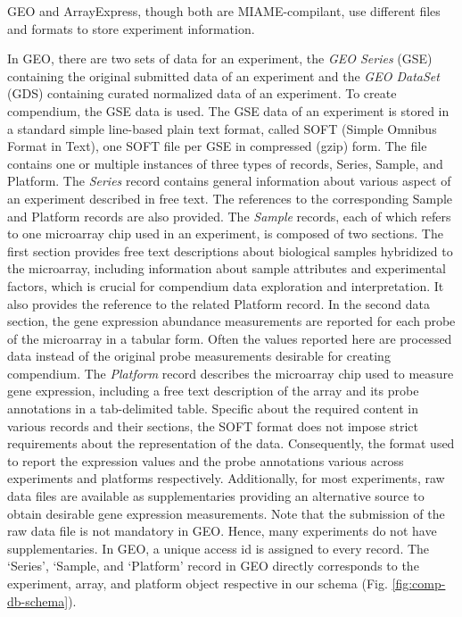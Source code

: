 GEO and ArrayExpress, though both are MIAME-compilant, use different 
files and formats to store experiment information.

%
In GEO, there are two sets of data for an experiment, the \textit{GEO Series}
(GSE) containing the original submitted data of an experiment and the
\textit{GEO DataSet} (GDS) containing curated normalized data of an experiment.
%
To create compendium, the GSE data is used.
%
The GSE data of an experiment is stored in a standard simple line-based plain
text format, called SOFT (Simple Omnibus Format in Text), one SOFT file per GSE
in compressed (gzip) form.
%
The file contains one or multiple instances of three types of records, Series,
Sample, and Platform.
%
The \textit{Series} record contains general information about various
aspect of an experiment described in free text.  The references to the
corresponding Sample and Platform records are also provided.
%
The \textit{Sample} records, each of which refers to one microarray chip
used in an experiment, is composed of two sections.
%
The first section provides free text descriptions about biological samples
hybridized to the microarray, including information about sample attributes and
experimental factors, which is crucial for compendium data exploration and
interpretation.
%
It also provides the reference to the related Platform record.
%
In the second data section, the gene expression abundance measurements are
reported for each probe of the microarray in a tabular form. Often the values
reported here are processed data instead of the original probe measurements
desirable for creating compendium.
%
The \textit{Platform} record describes the microarray chip used to measure gene
expression, including a free text description of the array and its probe
annotations in a tab-delimited table.
%
Specific about the required content in various records and their sections, the
SOFT format does not impose strict requirements about the representation of the
data.
%
Consequently, the format used to report the expression values and the probe
annotations various across experiments and platforms respectively.
%
Additionally, for most experiments, raw data files are available as
supplementaries providing an alternative source to obtain desirable gene
expression measurements.
%
Note that the submission of the raw data file is not mandatory in GEO.
%
Hence, many experiments do not have supplementaries.
%
In GEO, a unique access id is assigned to every record.
%
The `Series', `Sample, and `Platform' record in GEO directly corresponds
to the experiment, array, and platform object respective in our schema
(Fig. \ref{fig:comp-db-schema}).


